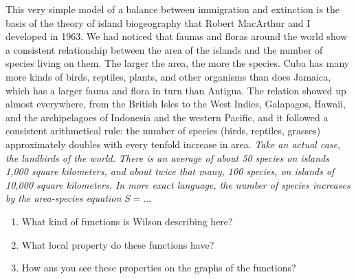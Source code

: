 \documentclass{ximera}
\begin{document}
This very simple model of a balance between immigration and extinction is the basis of the theory of island biogeography that Robert MacArthur and I developed in 1963. We had noticed that faunas and floras around the world show a consistent relationship between the area of the islands and the number of species living on them. The larger the area, the more the species. Cuba has many more kinds of birds, reptiles, plants, and other organisms than does Jamaica, which has a larger fauna and flora in turn than Antigua. The relation showed up almost everywhere, from the British Isles to the West Indies, Galapagos, Hawaii, and the archipelagoes of Indonesia and the western Pacific, and it followed a consistent arithmetical rule: the number of species (birds, reptiles, grasses) approximately doubles with every tenfold increase in area. \emph{Take an actual case, the landbirds of the world. There is an average of about 50 species on islands 1,000 square kilometers, and about twice that many, 100 species, on islands of 10,000 square kilometers. In more exact language, the number of species increases by the area-species equation} $S=\ldots$

\begin{question} \label{Q0f09f}
\begin{enumerate}
\item What kind of functions is Wilson describing here?

\item What local property do these functions have?

\item How ans you see these properties on the graphs of the functions?
\end{enumerate}
\end{question}


 
\end{document}
